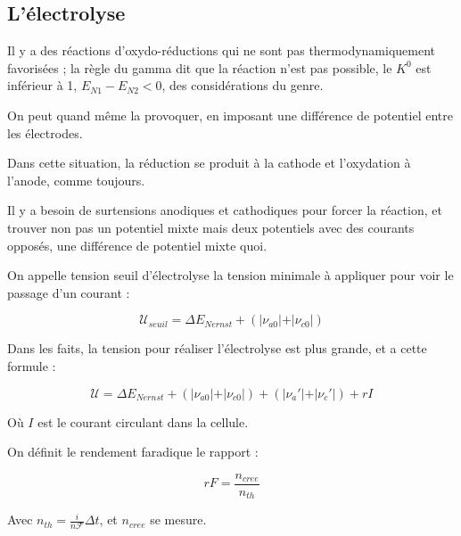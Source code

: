 \documentclass[a4paper,12pt]{book}
\newcommand{\Def}[2]{\begin{tcolorbox}[colback=white,colframe=red!10!green!20!blue!75!, title=Définition : #1]#2\end{tcolorbox}}
\begin{document}
\subsection{L'électrolyse}
\Def{L'électrolyse}{Il y a des réactions d'oxydo-réductions qui ne sont pas thermodynamiquement favorisées ; la règle du gamma dit que la réaction n'est pas possible, le $K^0$ est inférieur à 1, $E_{N1}-E_{N2}<0$, des considérations du genre.
\par On peut quand même la provoquer, en imposant une différence de potentiel entre les électrodes.
\par Dans cette situation, la réduction se produit à la cathode et l'oxydation à l'anode, comme toujours.
\par Il y a besoin de surtensions anodiques et cathodiques pour forcer la réaction, et trouver non pas un potentiel mixte mais deux potentiels avec des courants opposés, une différence de potentiel mixte quoi.
\par On appelle tension seuil d'électrolyse la tension minimale à appliquer pour voir le passage d'un courant :
\par $$\mathcal{U}_{seuil} = \Delta E_{Nernst} + (\vert\nu_{a0}\vert+\vert\nu_{c0}\vert)$$
\par Dans les faits, la tension pour réaliser l'électrolyse est plus grande, et a cette formule :
\par $$\mathcal{U} = \Delta E_{Nernst}+(\vert\nu_{a0}\vert+\vert\nu_{c0}\vert)+(\vert\nu_{a}'\vert+\vert\nu_{c}'\vert)+rI$$
\par Où $I$ est le courant circulant dans la cellule.
\par On définit le rendement faradique le rapport :
\par $$rF = \frac{n_{cree}}{n_{th}}$$
\par Avec $n_{th} =\frac{i}{n\mathcal{F}}\Delta t$, et $n_{cree}$ se mesure.}
\end{document}
